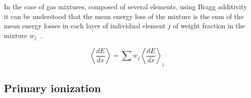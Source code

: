 \endgroup
	
	In the case of gas mixtures, composed of several elements, using Bragg additivity it can be understood that the mean energy loss of the mixture is the sum of the mean energy losses in each layer of individual element $j$ of weight fraction in the mixture $w_j$~\cite{PDG2018}.
	
	\begin{equation}
	\label{eq:mixtureloss}
	\left\langle \frac{dE}{dx} \right\rangle = \sum w_j \left\langle \frac{dE}{dx} \right\rangle_j
	\end{equation}
	
\newpage
		
	\subsection{Primary ionization}
	\label{chapt3:ssec:ionization}
	
